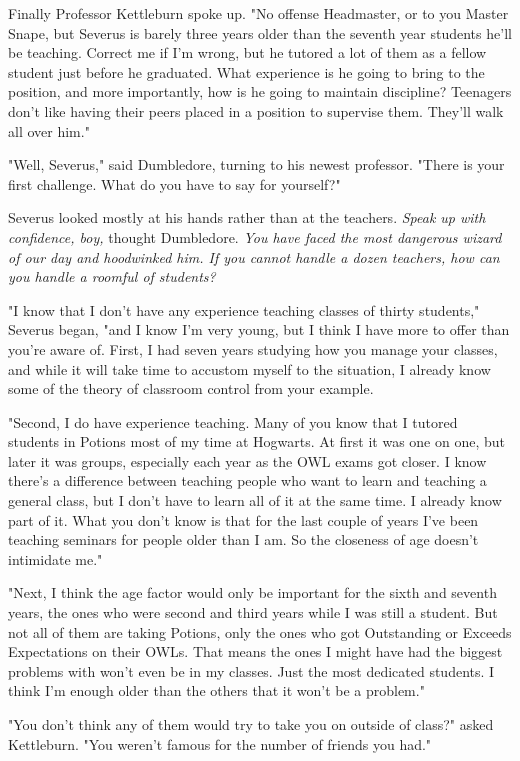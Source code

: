 Finally Professor Kettleburn spoke up. "No offense Headmaster, or to you Master Snape, but Severus is barely three years older than the seventh year students he'll be teaching. Correct me if I'm wrong, but he tutored a lot of them as a fellow student just before he graduated. What experience is he going to bring to the position, and more importantly, how is he going to maintain discipline? Teenagers don't like having their peers placed in a position to supervise them. They'll walk all over him."

"Well, Severus," said Dumbledore, turning to his newest professor. "There is your first challenge. What do you have to say for yourself?"

Severus looked mostly at his hands rather than at the teachers. \emph{Speak up with confidence, boy,} thought Dumbledore. \emph{You have faced the most dangerous wizard of our day and hoodwinked him. If you cannot handle a dozen teachers, how can you handle a roomful of students?}

"I know that I don't have any experience teaching classes of thirty students," Severus began, "and I know I'm very young, but I think I have more to offer than you're aware of. First, I had seven years studying how you manage your classes, and while it will take time to accustom myself to the situation, I already know some of the theory of classroom control from your example.

"Second, I do have experience teaching. Many of you know that I tutored students in Potions most of my time at Hogwarts. At first it was one on one, but later it was groups, especially each year as the OWL exams got closer. I know there's a difference between teaching people who want to learn and teaching a general class, but I don't have to learn all of it at the same time. I already know part of it. What you don't know is that for the last couple of years I've been teaching{\el} seminars for people older than I am. So the closeness of age doesn't intimidate me."

"Next, I think the age factor would only be important for the sixth and seventh years, the ones who were second and third years while I was still a student. But not all of them are taking Potions, only the ones who got Outstanding or Exceeds Expectations on their OWLs. That means the ones I might have had the biggest problems with won't even be in my classes. Just the most dedicated students. I think I'm enough older than the others that it won't be a problem."

"You don't think any of them would try to take you on outside of class?" asked Kettleburn. "You weren't famous for the number of friends you had."

